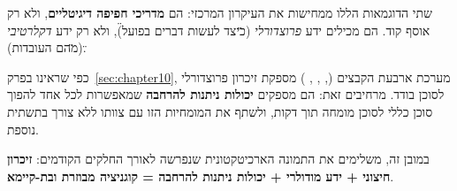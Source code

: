 שתי הדוגמאות הללו ממחישות את העיקרון המרכזי:  הם \textbf{מדריכי חפיפה דיגיטליים}, ולא רק אוסף קוד. הם מכילים ידע \textit{פרוצדורלי} (\"כיצד לעשות דברים בפועל\"), ולא רק ידע \textit{דקלרטיבי} (\"מהם העובדות\").

כפי שראינו בפרק~\ref{sec:chapter10}, מערכת ארבעת הקבצים (, , , ) מספקת זיכרון פרוצדורלי לסוכן בודד.  מרחיבים זאת: הם מספקים \textbf{יכולות ניתנות להרחבה} שמאפשרות לכל אחד להפוך סוכן כללי לסוכן מומחה תוך דקות, ולשתף את המומחיות הזו עם צוותו ללא צורך בתשתית נוספת.

במובן זה,  משלימים את התמונה הארכיטקטונית שנפרשה לאורך החלקים הקודמים: \textbf{זיכרון חיצוני + ידע מודולרי + יכולות ניתנות להרחבה = קוגניציה מבוזרת ובת-קיימא}.
